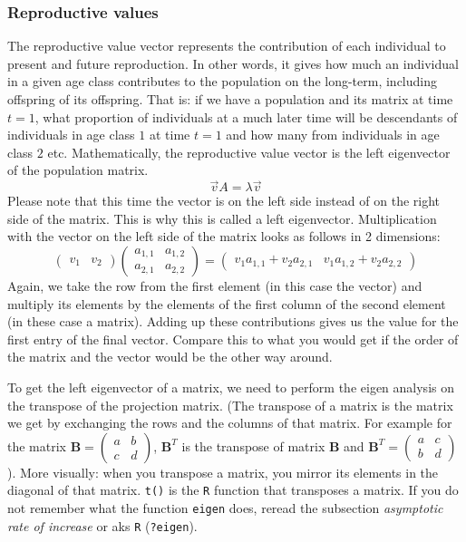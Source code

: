 \documentclass{article}\usepackage[]{graphicx}\usepackage[]{color}
\begin{document}
\subsubsection{Reproductive values}\label{Newfrhere}
The reproductive value vector represents the contribution of each individual to present and future reproduction. In other words, it gives how much an individual in a given age class contributes to the population on the long-term, including offspring of its offspring. That is: if we have a population and its matrix at time $t=1$, what proportion of individuals at a much later time will be descendants of individuals in age class $1$ at time $t=1$ and how many from individuals in age class $2$ etc. Mathematically, the reproductive value vector is the left eigenvector of the population matrix.
\begin{equation}
\vec{v}A=\lambda \vec{v}
\end{equation}
Please note that this time the vector is on the left side instead of on the right side of the matrix. This is why this is called a left eigenvector. Multiplication with the vector on the left side of the matrix looks as follows in 2 dimensions:
\begin{equation}
\begin{pmatrix} v_1 & v_2 \end{pmatrix} \begin{pmatrix} a_{1,1} & a_{1,2}\\ a_{2,1} & a_{2,2} \end{pmatrix} = \begin{pmatrix} v_1 a_{1,1} + v_2 a_{2,1} & v_1 a_{1,2} + v_2 a_{2,2} \end{pmatrix}
\end{equation}
Again, we take the row from the first element (in this case the vector) and multiply its elements by the elements of the first column of the second element (in these case a matrix). Adding up these contributions gives us the value for the first entry of the final vector. Compare this to what you would get if the order of the matrix and the vector would be the other way around.

To get the left eigenvector of a matrix, we need to perform the eigen analysis on the transpose of the projection matrix. (The transpose of a matrix is the matrix we get by exchanging the rows and the columns of that matrix. For example for the matrix $\boldsymbol{B}=\begin{pmatrix}a & b\\ c & d\end{pmatrix}$, $\boldsymbol{B}^T$ is the transpose of matrix $\boldsymbol{B}$ and $\boldsymbol{B}^T=\begin{pmatrix}a & c\\ b & d\end{pmatrix}$). More visually: when you transpose a matrix, you mirror its elements in the diagonal of that matrix. \texttt{t()} is the \texttt{R} function that transposes a matrix. If you do not remember what the function \texttt{eigen} does, reread the subsection \textit{asymptotic rate of increase} or aks \texttt{R} (\texttt{?eigen}).
\end{document}
